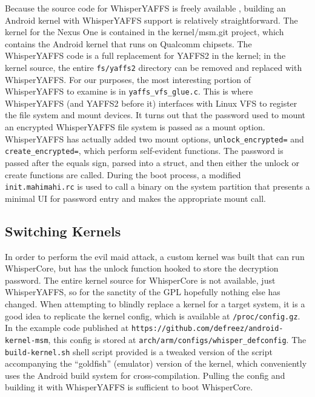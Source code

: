 Because the source code for WhisperYAFFS is freely available \cite{whisperyaffs}, building an Android kernel with WhisperYAFFS
support is relatively straightforward. The kernel for the Nexus One is contained in the kernel/msm.git project, which contains the
Android kernel that runs on Qualcomm chipsets.  The WhisperYAFFS code is a full replacement for YAFFS2 in the kernel; in the kernel
source, the entire \texttt{fs/yaffs2} directory can be removed and replaced with WhisperYAFFS.  For our purposes, the most
interesting portion of WhisperYAFFS to examine is in \texttt{yaffs\_vfs\_glue.c}.  This is where WhisperYAFFS (and YAFFS2 before it)
interfaces with Linux VFS to register the file system and mount devices.  It turns out that the password used to mount an encrypted
WhisperYAFFS file system is passed as a mount option.  WhisperYAFFS has actually added two mount options, \texttt{unlock\_encrypted=}
and \texttt{create\_encrypted=}, which perform self-evident functions.  The password is passed after the equals sign, parsed into a
struct, and then either the unlock or create functions are called.  During the boot process, a modified \texttt{init.mahimahi.rc} is
used to call a binary on the system partition that presents a minimal UI for password entry and makes the appropriate mount call. 

\subsection{Switching Kernels}
In order to perform the evil maid attack, a custom kernel was built that can run WhisperCore, but has the unlock function hooked
to store the decryption password.  The entire kernel source for WhisperCore is not available, just WhisperYAFFS, so for the sanctity
of the GPL hopefully nothing else has changed.  When attempting to blindly replace a kernel for a target system, it is a good idea
to replicate the kernel config, which is available at \texttt{/proc/config.gz}.  In the example code published at
\texttt{https://github.com/defreez/android-kernel-msm}, this config is stored at \texttt{arch/arm/configs/whisper\_defconfig}.  The
\texttt{build-kernel.sh} shell script provided is a tweaked version of the script accompanying the ``goldfish'' (emulator) version
of the kernel, which conveniently uses the Android build system for cross-compilation.  Pulling the config and building it with
WhisperYAFFS is sufficient to boot WhisperCore.

